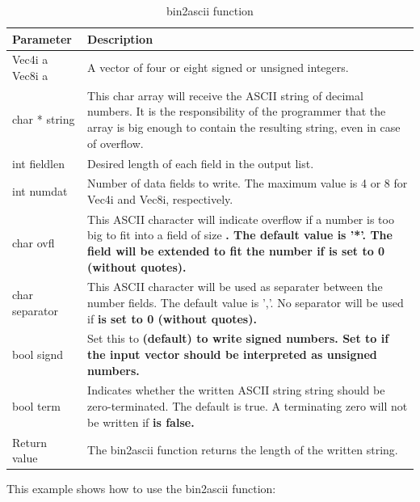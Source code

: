 \documentclass[11pt,a4paper,oneside,openright]{report}
\newcommand{\vspacebig}{\vspace{6mm}}
\newcommand{\codei}[1]{\bfseries \ttfamily{#1}\normalfont}
\begin{document}
\begin {table}[H]
\caption{bin2ascii function}
\label{table:bin2asciiFunction}
\begin{tabular}{|p{24mm}|p{130mm}|}
\hline
\bfseries Parameter & \bfseries Description \\ \hline
Vec4i a \newline Vec8i a & A vector of four or eight signed or unsigned integers.
 \\ \hline
char * string & This char array will receive the ASCII string of decimal numbers. It is the responsibility of the programmer that the array is big enough to contain the resulting string, even in case of overflow. \\ \hline
int fieldlen & Desired length of each field in the output list. \\ \hline
int numdat & Number of data fields to write. The maximum value is 4 or 8 for Vec4i and Vec8i, respectively. \\ \hline
char ovfl & This ASCII character will indicate overflow if a number is too big to fit into a field of size \codei{fieldlen}. The default value is '*'. The field will be extended to fit the number if \codei{ovfl} is set to 0 (without quotes). \\ \hline
char separator & This ASCII character will be used as separater between the number fields. The default value is ','. No separator will be used if  \codei{separator} is set to 0 (without quotes). \\ \hline
bool signd & Set this to \codei{true} (default) to write signed numbers. Set to \codei{false} if the input vector should be interpreted as unsigned numbers. \\  \hline
bool term & Indicates whether the written ASCII string string should be zero-terminated. The default is true. A terminating zero will not be written if \codei{term} is false. \\ \hline
Return value & The bin2ascii function returns the length of the written string. \\ \hline
\end{tabular}
\end{table}
\vspacebig


This example shows how to use the bin2ascii function:
\end{document}
